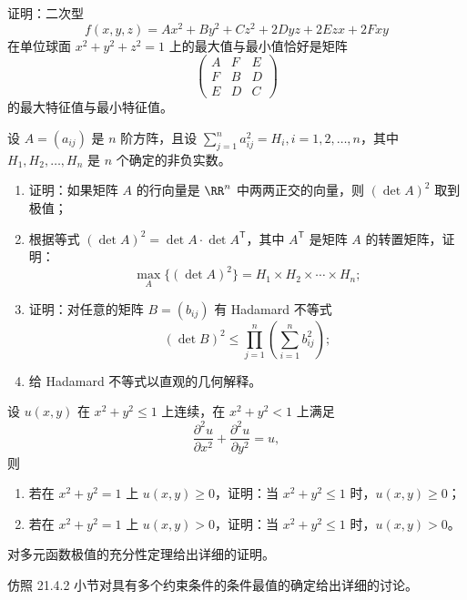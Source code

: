 \begin{xreferenceproblem}[8]
证明：二次型
  \[
    f(x,y,z)=Ax^2+By^2+Cz^2+2Dyz+2Ezx+2Fxy
  \]
  在单位球面 $x^2+y^2+z^2=1$ 上的最大值与最小值恰好是矩阵
  \[
    \begin{pmatrix}A&F&E\\F&B&D\\E&D&C\end{pmatrix}
  \]
  的最大特征值与最小特征值。
\end{xreferenceproblem}

\begin{xreferenceproblem}[9]
设 $A=(a_{ij})$ 是 $n$ 阶方阵，且设 $\sum_{j=1}^n a_{ij}^2=H_i,i=1,2,\ldots,n$，其中 $H_1,H_2,\ldots,H_n$ 是 $n$ 个确定的非负实数。
  \begin{enumerate}[label=(\arabic*)]
    \item 证明：如果矩阵 $A$ 的行向量是 $\RR^n$ 中两两正交的向量，则 $(\det A)^2$ 取到极值；
    \item 根据等式 $(\det A)^2=\det A\cdot\det A^{\mathsf T}$，其中 $A^{\mathsf T}$ 是矩阵 $A$ 的转置矩阵，证明：
    \[
      \max_A\{(\det A)^2\}=H_1\times H_2\times\cdots\times H_n;
    \]
    \item 证明：对任意的矩阵 $B=(b_{ij})$ 有 Hadamard 不等式
    \[
      (\det B)^2\le\prod_{j=1}^n\left(\sum_{i=1}^n b_{ij}^2\right);
    \]
    \item 给 Hadamard 不等式以直观的几何解释。
  \end{enumerate}
\end{xreferenceproblem}

\begin{xreferenceproblem}[10]
设 $u(x,y)$ 在 $x^2+y^2\le1$ 上连续，在 $x^2+y^2<1$ 上满足
  \[
    \frac{\partial^2u}{\partial x^2}+\frac{\partial^2u}{\partial y^2}=u,
  \]
  则
  \begin{enumerate}[label=(\arabic*)]
    \item 若在 $x^2+y^2=1$ 上 $u(x,y)\ge0$，证明：当 $x^2+y^2\le1$ 时，$u(x,y)\ge0$；
    \item 若在 $x^2+y^2=1$ 上 $u(x,y)>0$，证明：当 $x^2+y^2\le1$ 时，$u(x,y)>0$。
  \end{enumerate}
\end{xreferenceproblem}

\begin{xreferenceproblem}[11]
对多元函数极值的充分性定理给出详细的证明。
\end{xreferenceproblem}

\begin{xreferenceproblem}[12]
仿照 21.4.2 小节对具有多个约束条件的条件最值的确定给出详细的讨论。
\end{xreferenceproblem}

